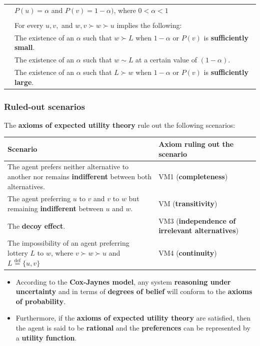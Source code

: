 \documentclass[11pt]{article}
\newcommand{\defequal}{\stackrel{\scriptscriptstyle\mathrm{def}}{=}}
\begin{document}
\begin{center}
\begin{tabular}{|m{7em}|m{25em}|}
 & \(P(u) = \alpha\) and \(P(v) = 1 - \alpha)\), where \(0 < \alpha < 1\)\\
 & \\
 & For every \(u, v,\) and \(w, v \succ w \succ u\) implies the following:\\
 & The existence of an \(\alpha\) such that \(w \succ L\) when \(1 - \alpha\) or \(P(v)\) is \textbf{sufficiently small}.\\
 & The existence of an \(\alpha\) such that \(w \sim L\) at a certain value of \((1 - \alpha)\).\\
 & The existence of an \(\alpha\) such that \(L \succ w\) when \(1 - \alpha\) or \(P(v)\) is \textbf{sufficiently large}.\\
\hline
\end{tabular}
\end{center}
\subsubsection{Ruled-out scenarios}
\label{sec:org8388347}
The \textbf{axioms of expected utility theory} rule out the following scenarios:
\begin{center}
\begin{tabularx}{\textwidth}{|X|X|}
\hline
Scenario & Axiom ruling out the scenario\\
\hline
The agent prefers neither alternative to another nor remains \textbf{indifferent} between both alternatives. & VM1 (\textbf{completeness})\\
\hline
The agent preferring \(u\) to \(v\) and \(v\) to \(w\) but remaining \textbf{indifferent} between \(u\) and \(w\). & VM (\textbf{transitivity})\\
\hline
The \textbf{decoy effect}. & VM3 (\textbf{independence of irrelevant alternatives})\\
\hline
The impossibility of an agent preferring lottery \(L\) to \(w\), where \(v \succ w \succ u\) and \(L \defequal \{u, v\}\) & VM4 (\textbf{continuity})\\
\hline
\end{tabularx}
\end{center}

\begin{itemize}
\item According to the \textbf{Cox-Jaynes model}, any system \textbf{reasoning under uncertainty} and in terms of \textbf{degrees of belief} will conform to the \textbf{axioms of probability}.
\item Furthermore, if the \textbf{axioms of expected utility theory} are satisfied, then the agent is said to be \textbf{rational} and the \textbf{preferences} can be represented by a \textbf{utility function}.
\end{itemize}
\end{document}
